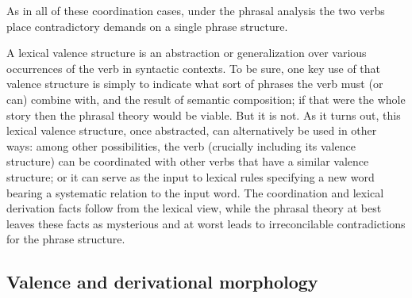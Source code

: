 \noindent
As in all of these \xnull coordination cases, under the phrasal analysis the two verbs place
contradictory demands on a single phrase structure.   

A lexical valence structure is an abstraction or generalization over various occurrences of the verb
in syntactic contexts.  To be sure, one key use of that valence structure is simply to indicate what
sort of phrases the verb must (or can) combine with, and the result of semantic composition; if that
were the whole story then the phrasal theory would be viable.  But it is not.  As it turns out, this
lexical valence structure, once abstracted, can alternatively be used in other ways: among other
possibilities, the verb (crucially including its valence structure) can be coordinated with other
verbs that have a similar valence structure; or it can serve as the input to lexical rules
specifying a new word bearing a systematic relation to the input word.  The coordination and lexical
derivation facts follow from the lexical view, while the phrasal theory at best leaves these facts
as mysterious and at worst leads to irreconcilable contradictions for the phrase structure.   


%
%
%


\subsection{Valence and derivational morphology}
\label{sec-val-morph}\label{sec-phrasal-LI}\label{sec-inheritance-passive-LFG}

